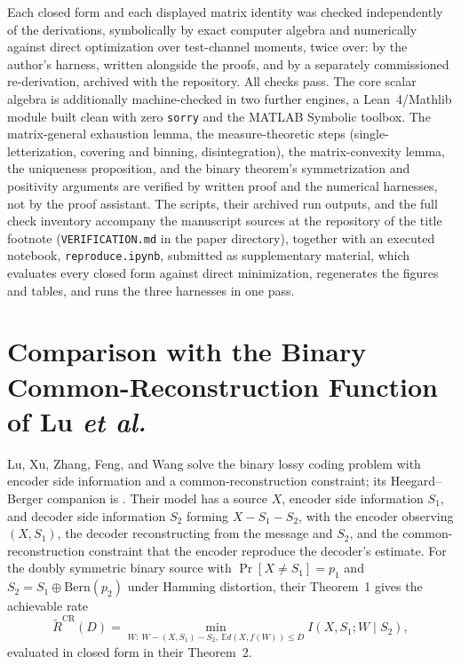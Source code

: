 \documentclass[11pt,onecolumn]{IEEEtran}
\newcommand{\E}{\mathbb{E}}
\begin{document}
Each closed form and each displayed matrix identity was checked
independently of the derivations, symbolically by exact computer algebra
and numerically against direct optimization over test-channel moments,
twice over: by the author's harness, written alongside the proofs, and
by a separately commissioned re-derivation, archived with the
repository. All checks pass. The core scalar algebra is
additionally machine-checked in two further engines, a Lean~4/Mathlib
module built clean with zero \texttt{sorry} and the MATLAB Symbolic
toolbox. The matrix-general exhaustion lemma, the measure-theoretic
steps (single-letterization, covering and binning, disintegration), the
matrix-convexity lemma, the uniqueness proposition, and the binary
theorem's symmetrization and positivity arguments are verified by
written proof and the numerical harnesses, not by the proof assistant.
The scripts, their archived run outputs, and the full check inventory
accompany the manuscript sources at the repository of the title
footnote (\texttt{VERIFICATION.md} in the paper directory), together
with an executed notebook, \texttt{reproduce.ipynb}, submitted as
supplementary material, which evaluates every closed form against
direct minimization, regenerates the figures and tables, and runs the
three harnesses in one pass.

\section{Comparison with the Binary Common-Reconstruction Function of Lu \emph{et al.}}
\label{app:lucompare}

Lu, Xu, Zhang, Feng, and Wang \cite{lu2016lossy} solve the binary lossy coding
problem with encoder side information and a common-reconstruction constraint;
its Heegard--Berger companion is \cite{lu2016binary}. Their model has a source
$X$, encoder side information $S_1$, and decoder side information $S_2$ forming
$X-S_1-S_2$, with the encoder observing $(X,S_1)$, the decoder reconstructing
from the message and $S_2$, and the common-reconstruction constraint that the
encoder reproduce the decoder's estimate. For the doubly symmetric binary source
with $\Pr[X\ne S_1]=p_1$ and $S_2=S_1\oplus\mathrm{Bern}(p_2)$ under Hamming
distortion, their Theorem~1 gives the achievable rate
\[
  \widetilde R^{\mathrm{CR}}(D)
  =\min_{W:\ W-(X,S_1)-S_2,\ \E d(X,f(W))\le D} I(X,S_1;W\mid S_2),
\]
evaluated in closed form in their Theorem~2.
\end{document}

